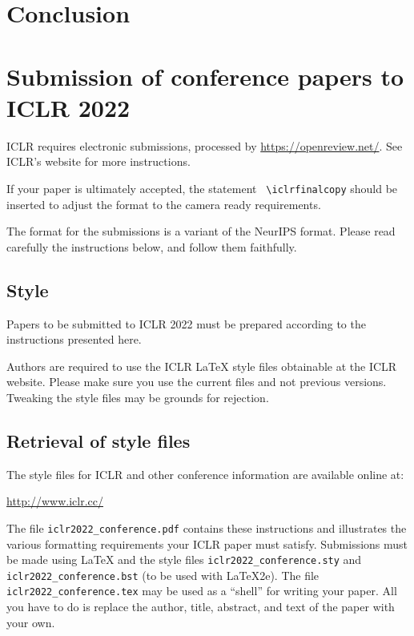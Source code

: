 \documentclass{article} %
\begin{document}
\section{Conclusion}

\section{Submission of conference papers to ICLR 2022}

ICLR requires electronic submissions, processed by
\url{https://openreview.net/}. See ICLR's website for more instructions.

If your paper is ultimately accepted, the statement {\tt
      {\textbackslash}iclrfinalcopy} should be inserted to adjust the
format to the camera ready requirements.

The format for the submissions is a variant of the NeurIPS format.
Please read carefully the instructions below, and follow them
faithfully.

\subsection{Style}

Papers to be submitted to ICLR 2022 must be prepared according to the
instructions presented here.


Authors are required to use the ICLR \LaTeX{} style files obtainable at the
ICLR website. Please make sure you use the current files and
not previous versions. Tweaking the style files may be grounds for rejection.

\subsection{Retrieval of style files}

The style files for ICLR and other conference information are available online at:
\begin{center}
   \url{http://www.iclr.cc/}
\end{center}
The file \verb+iclr2022_conference.pdf+ contains these
instructions and illustrates the
various formatting requirements your ICLR paper must satisfy.
Submissions must be made using \LaTeX{} and the style files
\verb+iclr2022_conference.sty+ and \verb+iclr2022_conference.bst+ (to be used with \LaTeX{}2e). The file
\verb+iclr2022_conference.tex+ may be used as a ``shell'' for writing your paper. All you
have to do is replace the author, title, abstract, and text of the paper with
your own.
\end{document}
